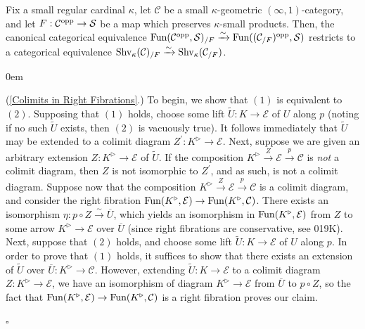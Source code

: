 \documentclass[10pt]{article}
\newcommand{\mS}{\mathcal S}
\newcommand{\C}{\mathcal C}
\newcommand{\cE}{\mathcal{E}}
\renewcommand{\qed}{\hfill$\square$}
\renewenvironment{proof}{\begin{addmargin}[1em]{0em}\begin{newproof}}{\end{newproof}\end{addmargin}\qed}
\theoremstyle{witharg}
\theoremstyle{witharg}
\theoremstyle{witharg2}
\begin{document}
\begin{corollary}{}\label{Slices of kappa sheaf topoi}

    Fix a small regular cardinal $\kappa$, let $\C$ be a small $\kappa$-geometric $(\infty,1)$-category, and let $F:\C^{\textnormal{opp}}\rightarrow \mS$ be a map which preserves $\kappa$-small products. Then, the canonical categorical equivalence $\textnormal{Fun}(\C^{\textnormal{opp}},\mS)_{/F}\xrightarrow{\sim}\textnormal{Fun}((\C_{/F})^{\textnormal{opp}},\mS)$ restricts to a categorical equivalence $\textnormal{Shv}_{\kappa}(\C)_{/F}\xrightarrow{\sim}\textnormal{Shv}_{\kappa}(\C_{/F})$.
    
\end{corollary}




\begin{proof}


    (\ref{Colimits in Right Fibrations}.) To begin, we show that $(1)$ is equivalent to $(2)$. Supposing that $(1)$ holds, choose some lift $\widetilde{U}:K\rightarrow \cE$ of $U$ along $p$ (noting if no such $\widetilde{U}$ exists, then $(2)$ is vacuously true). It follows immediately that $\widetilde{U}$ may be extended to a colimit diagram $Z^\prime:K^\triangleright\rightarrow \cE$. Next, suppose we are given an arbitrary extension $Z:K^\triangleright\rightarrow \cE$ of $\widetilde{U}$. If the composition $K^\triangleright\xrightarrow{Z} \cE\xrightarrow{p}\C$ is \emph{not} a colimit diagram, then $Z$ is not isomorphic to $Z^\prime$, and as such, is not a colimit diagram. Suppose now that the composition $K^\triangleright\xrightarrow{Z} \cE\xrightarrow{p}\C$ is a colimit diagram, and consider the right fibration $\textnormal{Fun}(K^\triangleright,\cE)\rightarrow \textnormal{Fun}(K^\triangleright,\C)$. There exists an isomorphism $\eta:p\circ Z\xrightarrow{\sim}\overline{U}$, which yields an isomorphism in $\textnormal{Fun}(K^\triangleright,\cE)$ from $Z$ to some arrow $K^\triangleright\rightarrow \cE$ over $\overline{U}$ (since right fibrations are conservative, see  019K). Next, suppose that $(2)$ holds, and choose some lift $\widetilde{U}:K\rightarrow \cE$ of $U$ along $p$. In order to prove that $(1)$ holds, it suffices to show that there exists an extension of $\widetilde{U}$ over $\overline{U}:K^\triangleright\rightarrow \C$. However, extending $\widetilde{U}:K\rightarrow \cE$ to a colimit diagram $Z:K^\triangleright\rightarrow \cE$, we have an isomorphism of diagram $K^\triangleright\rightarrow \cE$ from $\overline{U}$ to $p\circ Z$, so the fact that $\textnormal{Fun}(K^\triangleright,\cE)\rightarrow \textnormal{Fun}(K^\triangleright,\C)$ is a right fibration proves our claim. 
    


\end{proof}
\end{document}
